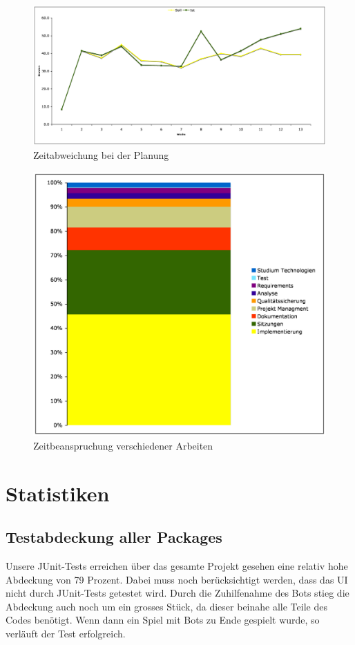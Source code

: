 \documentclass[12pt,halfparskip]{scrartcl}
\begin{document}
\begin{figure}[h]
	\centering
	\includegraphics[width=0.8 \textwidth]{zeitabweichung}
	\caption{Zeitabweichung bei der Planung}
	\label{fig:zeitabweichung}
\end{figure}

\begin{figure}[h]
	\centering
	\includegraphics[width=0.8 \textwidth]{zeitbeachspruchung_arbeiten}
	\caption{Zeitbeanspruchung verschiedener Arbeiten}
	\label{fig:zeitbeachspruchung_arbeiten}
\end{figure}

\section{Statistiken}
\subsection{Testabdeckung aller Packages}

Unsere JUnit-Tests erreichen über das gesamte Projekt gesehen eine relativ hohe Abdeckung von 79 Prozent. Dabei muss noch berücksichtigt werden, dass das UI nicht durch JUnit-Tests getestet wird. Durch die Zuhilfenahme des Bots stieg die Abdeckung auch noch um ein grosses Stück, da dieser beinahe alle Teile des Codes benötigt. Wenn dann ein Spiel mit Bots zu Ende gespielt wurde, so verläuft der Test erfolgreich.
\end{document}
